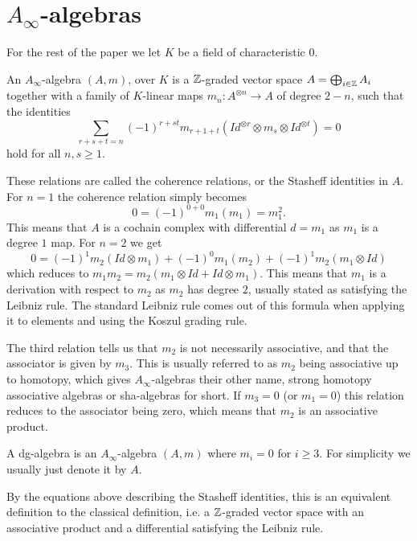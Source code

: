 
\section{\texorpdfstring{$A_\infty$}{A}-algebras}

For the rest of the paper we let $K$ be a field of characteristic $0$. 

\begin{definition}
    An $A_\infty$-algebra $(A, m)$, over $K$ is a $\mathbb{Z}$-graded vector 
    space $A=\bigoplus_{i\in \mathbb{Z}}A_i$ together with a family of $K$-linear maps 
    $m_n : A^{\otimes n}\longrightarrow A$ of degree $2-n$, such that the identities
    $$\sum_{r+s+t = n}(-1)^{r+st}m_{r+1+t} (Id^{\otimes r}\otimes m_s \otimes Id^{\otimes t}) = 0$$
    hold for all $n, s\geq 1$.
\end{definition}

These relations are called the coherence relations, or the Stasheff identities in $A$. 
For $n=1$ the coherence relation simply becomes $$0 = (-1)^{0+0}m_1 (m_1) = m_1^2 .$$ This 
means that $A$ is a cochain complex with differential $d=m_1$ as $m_1$ is a degree 
$1$ map. For $n=2$ we get
$$0 = (-1)^{1}m_2(Id\otimes m_1)+(-1)^{0}m_1 (m_2)+(-1)^{1}m_2 (m_1\otimes Id)$$
which reduces to $m_1 m_2 = m_2(m_1\otimes Id + Id\otimes m_1)$. This means that $m_1$ is 
a derivation with respect to $m_2$ as $m_2$ has degree $2$, usually stated as satisfying 
the Leibniz rule. The standard Leibniz rule comes out of this formula when applying it to 
elements and using the Koszul grading rule.

The third relation tells us that $m_2$ is not necessarily associative, and that the 
associator is given by $m_3$. This is usually referred to as $m_2$ being associative up 
to homotopy, which gives $A_\infty$-algebras their other name, strong homotopy associative 
algebras or sha-algebras for short. If $m_3=0$ (or $m_1=0$) this relation reduces to the 
associator being zero, which means that $m_2$ is an associative product. 

\begin{definition}
    A dg-algebra is an $A_\infty$-algebra $(A, m)$ where $m_i = 0$ for 
    $i \geq 3$. For simplicity we usually just denote it by $A$. 
\end{definition}

By the equations above describing the Stasheff identities, this is an equivalent 
definition to the classical definition, i.e. a $\mathbb{Z}$-graded vector space with an 
associative product and a differential satisfying the Leibniz rule. 

